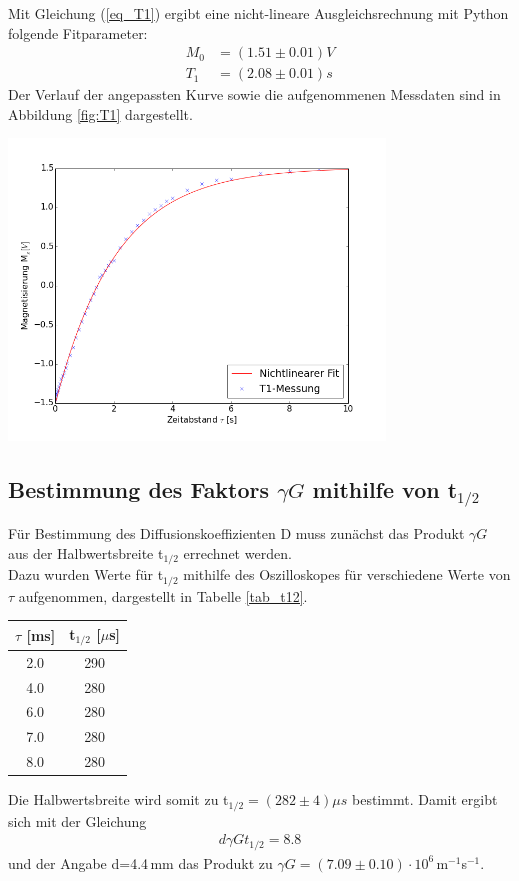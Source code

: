 \documentclass[]{scrartcl}
\begin{document}
Mit Gleichung (\ref{eq_T1}) ergibt eine nicht-lineare Ausgleichsrechnung mit Python folgende Fitparameter:
\begin{align*}
M_0&=(1.51 \pm 0.01)\si{V} \\
T_1&=(2.08 \pm 0.01)\si{s}
\end{align*}
Der Verlauf der angepassten Kurve sowie die aufgenommenen Messdaten sind in Abbildung \ref{fig:T1} dargestellt. 
\begin{center}
		\includegraphics[width=10cm]{images/plotT1.png}
		\label{fig:T1}
\end{center}

\subsection{Bestimmung des Faktors $\gamma G$ mithilfe von t$_{1/2}$}
Für Bestimmung des Diffusionskoeffizienten D muss zunächst das Produkt  $\gamma G$ aus der Halbwertsbreite t$_{1/2}$ errechnet werden. \\
Dazu wurden Werte für t$_{1/2}$ mithilfe des Oszilloskopes für verschiedene Werte von $\tau$ aufgenommen, dargestellt in Tabelle \ref{tab_t12}.
\begin{center}
	\begin{tabular}{|c|c|}
	\hline $\tau$ [ms] & t$_{1/2}$ [$\mu$s] \\
	\hline 2.0 & 290 \\
	\hline 4.0 & 280 \\
	\hline 6.0 & 280 \\
	\hline 7.0 & 280 \\
	\hline 8.0 & 280 \\
	\hline
	\end{tabular}
	\label{tab_t12}
\end{center}
Die Halbwertsbreite wird somit zu t$_{1/2}=(282 \pm 4) \mu s$ bestimmt. Damit ergibt sich mit der Gleichung 
\begin{align*}
d\gamma G t_{1/2} = 8.8
\end{align*}
und der Angabe d=4.4\,mm das Produkt zu $\gamma G=(7.09\pm0.10)\cdot 10^6\,$m$^{-1}$s$^{-1}$.
\end{document}
